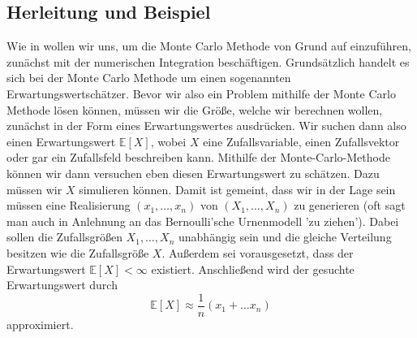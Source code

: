 \subsection{Herleitung und Beispiel}
Wie in \cite{lapeyre2003introduction} wollen wir uns, um die Monte Carlo Methode von Grund auf einzuführen, zunächst mit der numerischen Integration beschäftigen. Grundsätzlich handelt es sich bei der Monte Carlo Methode um einen sogenannten Erwartungswertschätzer. Bevor wir also ein Problem mithilfe der Monte Carlo Methode lösen können, müssen wir die Größe, welche wir berechnen wollen, zunächst in der Form eines Erwartungswertes ausdrücken.
Wir suchen dann also einen Erwartungswert $ \mathbb{E}[X] $, wobei $ X $ eine Zufallsvariable, einen Zufallsvektor oder gar ein Zufallsfeld beschreiben kann.
Mithilfe der Monte-Carlo-Methode können wir dann versuchen eben diesen Erwartungswert zu schätzen. Dazu müssen wir $ X $ simulieren können. Damit ist gemeint, dass wir in der Lage sein müssen eine Realisierung $ (x_1,\dots,x_n) $ von $ (X_1,\dots,X_n) $ zu generieren (oft sagt man auch in Anlehnung an das Bernoulli'sche Urnenmodell 'zu ziehen'). Dabei sollen die Zufallsgrößen $ X_1,\dots,X_n $ unabhängig sein und die gleiche Verteilung besitzen wie die Zufallsgröße $ X $. Außerdem sei vorausgesetzt, dass der Erwartungswert $ \mathbb{E}[X] < \infty $ existiert.
Anschließend wird der gesuchte Erwartungswert durch
\[
	\mathbb{E}[X] \approx \frac{1}{n}(x_1 + \dots x_n)
\]
approximiert.

